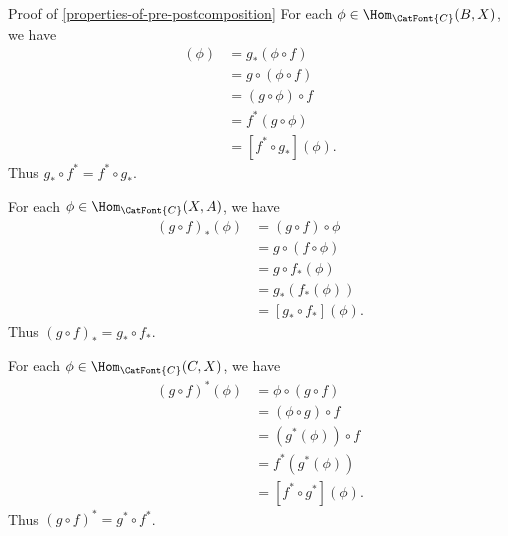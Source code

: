 \begin{Proof}{Proof of \cref{properties-of-pre-postcomposition}}%
    For each $\phi\in\Hom_{\CatFont{C}}(B,X)$, we have
    \begin{align*}
        [g_{*}\circ f^{*}](\phi) &= g_{*}(\phi\circ f)\\
                                 &= g\circ(\phi\circ f)\\
                                 &= (g\circ\phi)\circ f\\
                                 &= f^{*}(g\circ\phi)\\
                                 &= [f^{*}\circ g_{*}](\phi).
    \end{align*}
    Thus $g_{*}\circ f^{*}=f^{*}\circ g_{*}$.

    For each $\phi\in\Hom_{\CatFont{C}}(X,A)$, we have
    \begin{align*}
        (g\circ f)_{*}(\phi) &= (g\circ f)\circ \phi\\
                             &= g\circ(f\circ \phi)\\
                             &= g\circ f_{*}(\phi)\\
                             &= g_{*}(f_{*}(\phi))\\
                             &= [g_{*}\circ f_{*}](\phi).
    \end{align*}
    Thus $(g\circ f)_{*}=g_{*}\circ f_{*}$.

    For each $\phi\in\Hom_{\CatFont{C}}(C,X)$, we have
    \begin{align*}
        (g\circ f)^{*}(\phi) &= \phi\circ(g\circ f)\\
                             &= (\phi\circ g)\circ f\\
                             &= (g^{*}(\phi))\circ f\\
                             &= f^{*}(g^{*}(\phi))\\
                             &= [f^{*}\circ g^{*}](\phi).
    \end{align*}
    Thus $(g\circ f)^{*}=g^{*}\circ f^{*}$.


\end{Proof}

